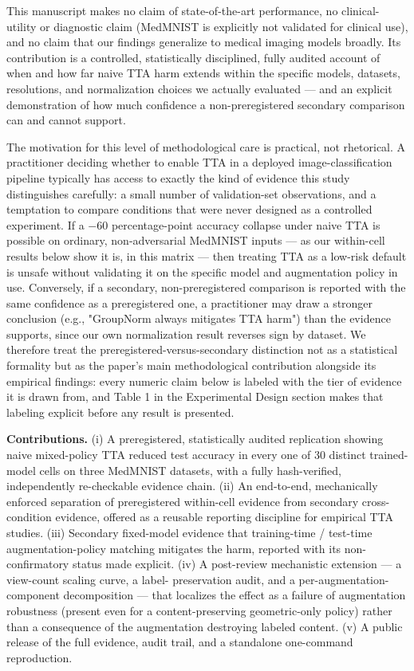 This manuscript makes no claim of state-of-the-art performance, no clinical-utility or diagnostic claim (MedMNIST is explicitly not validated for clinical use), and no claim that our findings generalize to medical imaging models broadly. Its contribution is a controlled, statistically disciplined, fully audited account of when and how far naive TTA harm extends within the specific models, datasets, resolutions, and normalization choices we actually evaluated --- and an explicit demonstration of how much confidence a non-preregistered secondary comparison can and cannot support.

The motivation for this level of methodological care is practical, not rhetorical. A practitioner deciding whether to enable TTA in a deployed image-classification pipeline typically has access to exactly the kind of evidence this study distinguishes carefully: a small number of validation-set observations, and a temptation to compare conditions that were never designed as a controlled experiment. If a $-$60 percentage-point accuracy collapse under naive TTA is possible on ordinary, non-adversarial MedMNIST inputs --- as our within-cell results below show it is, in this matrix --- then treating TTA as a low-risk default is unsafe without validating it on the specific model and augmentation policy in use. Conversely, if a secondary, non-preregistered comparison is reported with the same confidence as a preregistered one, a practitioner may draw a stronger conclusion (e.g., "GroupNorm always mitigates TTA harm") than the evidence supports, since our own normalization result reverses sign by dataset. We therefore treat the preregistered-versus-secondary distinction not as a statistical formality but as the paper's main methodological contribution alongside its empirical findings: every numeric claim below is labeled with the tier of evidence it is drawn from, and Table 1 in the Experimental Design section makes that labeling explicit before any result is presented.

\textbf{Contributions.} (i) A preregistered, statistically audited replication showing naive mixed-policy TTA reduced test accuracy in every one of 30 distinct trained-model cells on three MedMNIST datasets, with a fully hash-verified, independently re-checkable evidence chain. (ii) An end-to-end, mechanically enforced separation of preregistered within-cell evidence from secondary cross-condition evidence, offered as a reusable reporting discipline for empirical TTA studies. (iii) Secondary fixed-model evidence that training-time / test-time augmentation-policy matching mitigates the harm, reported with its non-confirmatory status made explicit. (iv) A post-review mechanistic extension --- a view-count scaling curve, a label- preservation audit, and a per-augmentation-component decomposition --- that localizes the effect as a failure of augmentation robustness (present even for a content-preserving geometric-only policy) rather than a consequence of the augmentation destroying labeled content. (v) A public release of the full evidence, audit trail, and a standalone one-command reproduction.

